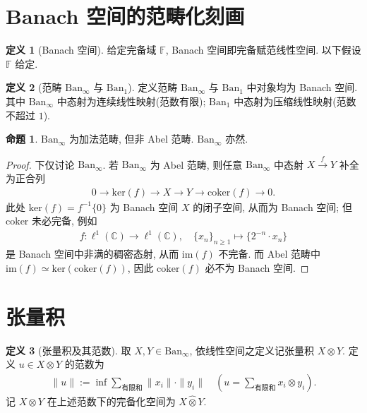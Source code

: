 \documentclass{MainStyle}
\theoremstyle{definition}
\theoremstyle{definition}
\theoremstyle{definition}
\newtheorem{definition}{定义}
\theoremstyle{definition}
\newtheorem{proposition}{命题}
\theoremstyle{definition}
\theoremstyle{definition}
\theoremstyle{definition}
\theoremstyle{remark}
\theoremstyle{remark}
\begin{document}
\maketitle
\tableofcontents
\section{Banach 空间的范畴化刻画}

\begin{definition}[Banach 空间]
    给定完备域 $\mathbb F$, Banach 空间即完备赋范线性空间. 以下假设 $\mathbb F$ 给定.
\end{definition}

\begin{definition}[范畴 $\mathrm{Ban}_\infty$ 与 $\mathrm{Ban}_1$]
    定义范畴 $\mathrm{Ban}_\infty$ 与 $\mathrm{Ban}_1$ 中对象均为 Banach 空间. 其中 $\mathrm{Ban}_\infty$ 中态射为连续线性映射(范数有限); $\mathrm{Ban}_1$ 中态射为压缩线性映射(范数不超过 $1$).
\end{definition}

\begin{proposition}
    $\mathrm{Ban}_\infty$ 为加法范畴, 但非 Abel 范畴. $\mathrm{Ban}_\infty$ 亦然.
    \begin{proof}
        下仅讨论 $\mathrm{Ban}_\infty$. 若 $\mathrm{Ban}_\infty$ 为 Abel 范畴, 则任意 $\mathrm{Ban}_\infty$ 中态射 $X\overset f\to Y$ 补全为正合列
        \begin{align*}
            0\to \mathrm{ker}(f)\to X\to Y\to \mathrm{coker}(f)\to 0.
        \end{align*}
        此处 $\mathrm{ker}(f)=f^{-1}\{0\}$ 为 Banach 空间 $X$ 的闭子空间, 从而为 Banach 空间; 但 $\mathrm{coker}$ 未必完备, 例如
        \begin{align*}
            f:\ell^1(\mathbb C)\to \ell^1(\mathbb C),\quad \{x_n\}_{n\geq 1}\mapsto \{2^{-n}\cdot x_n\}
        \end{align*}
        是 Banach 空间中非满的稠密态射, 从而 $\mathrm{im}(f)$ 不完备. 而 Abel 范畴中 $\mathrm{im}(f)\simeq \mathrm{ker}(\mathrm{coker}(f))$, 因此 $\mathrm{coker}(f)$ 必不为 Banach 空间.
    \end{proof}
\end{proposition}

\section{张量积}

\begin{definition}[张量积及其范数]
    取 $X,Y\in \mathrm{Ban}_\infty$, 依线性空间之定义记张量积 $X\otimes Y$. 定义 $u\in X\otimes Y$ 的范数为
    \begin{align*}
        \|u\|:=\inf\sum_{\text{有限和}}\|x_i\|\cdot \|y_i\|\quad \left(u=\sum_{\text{有限和}} x_i\otimes y_i\right).
    \end{align*}
    记 $X\otimes Y$ 在上述范数下的完备化空间为 $X\hat \otimes Y$.
\end{definition}
\end{document}
